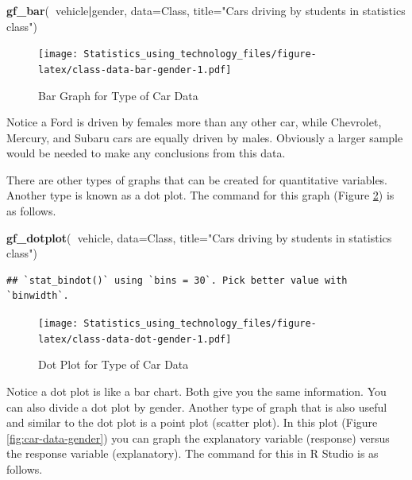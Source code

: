 \documentclass[]{book}
\newenvironment{Shaded}{\begin{snugshade}}{\end{snugshade}}
\newcommand{\DataTypeTok}[1]{\textcolor[rgb]{0.13,0.29,0.53}{#1}}
\newcommand{\KeywordTok}[1]{\textcolor[rgb]{0.13,0.29,0.53}{\textbf{#1}}}
\newcommand{\NormalTok}[1]{#1}
\newcommand{\OperatorTok}[1]{\textcolor[rgb]{0.81,0.36,0.00}{\textbf{#1}}}
\newcommand{\StringTok}[1]{\textcolor[rgb]{0.31,0.60,0.02}{#1}}
\begin{document}
\begin{Shaded}
\begin{Highlighting}[]
\KeywordTok{gf_bar}\NormalTok{(}\OperatorTok{~}\NormalTok{vehicle}\OperatorTok{|}\NormalTok{gender, }\DataTypeTok{data=}\NormalTok{Class, }\DataTypeTok{title=}\StringTok{"Cars driving by students in statistics class"}\NormalTok{)}
\end{Highlighting}
\end{Shaded}

\begin{figure}
\centering
\texttt{[image: Statistics\_using\_technology\_files/figure-latex/class-data-bar-gender-1.pdf]}
\caption{\label{fig:class-data-bar-gender}Bar Graph for Type of Car Data}
\end{figure}

Notice a Ford is driven by females more than any other car, while Chevrolet, Mercury, and Subaru cars are equally driven by males. Obviously a larger sample would be needed to make any conclusions from this data.

There are other types of graphs that can be created for quantitative variables. Another type is known as a dot plot. The command for this graph (Figure \ref{fig:class-data-dot-gender}) is as follows.



\begin{Shaded}
\begin{Highlighting}[]
\KeywordTok{gf_dotplot}\NormalTok{(}\OperatorTok{~}\NormalTok{vehicle, }\DataTypeTok{data=}\NormalTok{Class, }\DataTypeTok{title=}\StringTok{"Cars driving by students in statistics class"}\NormalTok{)}
\end{Highlighting}
\end{Shaded}

\begin{verbatim}
## `stat_bindot()` using `bins = 30`. Pick better value with `binwidth`.
\end{verbatim}

\begin{figure}
\centering
\texttt{[image: Statistics\_using\_technology\_files/figure-latex/class-data-dot-gender-1.pdf]}
\caption{\label{fig:class-data-dot-gender}Dot Plot for Type of Car Data}
\end{figure}

Notice a dot plot is like a bar chart. Both give you the same information. You can also divide a dot plot by gender. Another type of graph that is also useful and similar to the dot plot is a point plot (scatter plot). In this plot (Figure \ref{fig:car-data-gender}) you can graph the explanatory variable (response) versus the response variable (explanatory). The command for this in R Studio is as follows.
\end{document}
